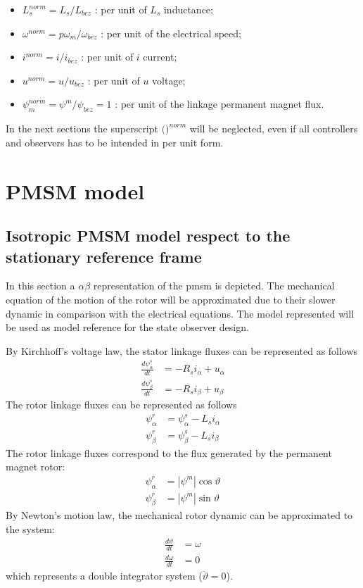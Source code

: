 \documentclass[11pt,a4paper]{article}
\numberwithin{equation}{section}
\newcommand{\abs}[1]{\left|#1\right|}
\theoremstyle{it}
\theoremstyle{definition}
\begin{document}
\begin{onehalfspace}
\begin{itemize}
\begin{itemize}
		\item[--] $L_s^{norm} = L_s/L_{bez}$ : per unit of $L_s$ inductance;
		\item[--] $\omega^{norm} = p\omega_m/\omega_{bez}$ : per unit of the electrical speed;		
		\item[--] $i^{norm} = i/i_{bez}$ : per unit of $i$ current;
		\item[--] $u^{norm} = u/u_{bez}$ : per unit of $u$ voltage;
		\item[--] $\psi_m^{norm} = \psi^m/\psi_{bez} = 1$ : per unit of the linkage permanent magnet flux.
	\end{itemize}	 
\end{itemize}
In the next sections the superscript $\Big(\Big)^{norm}$ will be neglected, even if all controllers and observers has to be intended in per unit form. 

\section{PMSM model}	
\subsection{Isotropic PMSM model respect to the stationary reference frame}
In this section a $\alpha\beta$ representation of the pmsm is depicted. The mechanical equation of the motion of the rotor will be approximated due to their slower dynamic in comparison with the electrical equations. The model represented will be used as model reference for the state observer design.

By Kirchhoff's voltage law, the stator linkage fluxes can be represented as follows
\begin{align}
	\frac{d\psi_{\alpha}^s}{dt} &= -R_si_{\alpha} + u_{\alpha} \\[6pt]
	\frac{d\psi_{\beta}^s}{dt} &= -R_si_{\beta} + u_{\beta}
\end{align}
The rotor linkage fluxes can be represented as follows
\begin{align}
	\psi_{\alpha}^r &= \psi_{\alpha}^s -L_s i_{\alpha} \\[6pt]
	\psi_{\beta}^r &= \psi_{\beta}^s -L_s i_{\beta}
\end{align}
The rotor linkage fluxes correspond to the flux generated by the permanent magnet rotor:
\begin{align}
	\psi_{\alpha}^r &= \abs{\psi^m}\cos\vartheta \\[6pt]
	\psi_{\beta}^r &= \abs{\psi^m}\sin\vartheta
\end{align}
By Newton's motion law, the mechanical rotor dynamic can be approximated to the system:
\begin{align}
	\frac{d\vartheta}{dt} &= \omega \\[6pt]
	\frac{d\omega}{dt} &= 0
\end{align}
which represents a double integrator system ($\ddot{\vartheta}=0$).


\end{onehalfspace}
\end{document}
